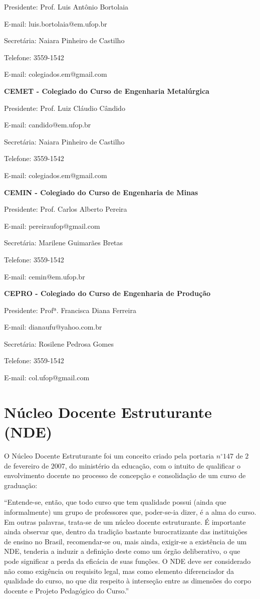 Presidente: Prof. Luis Antônio Bortolaia

E-mail: luis.bortolaia@em.ufop.br

Secretária: Naiara Pinheiro de Castilho

Telefone: 3559-1542

E-mail: colegiados.em@gmail.com

\textbf{CEMET - Colegiado do Curso de Engenharia Metalúrgica}

Presidente: Prof. Luiz Cláudio Cândido

E-mail: candido@em.ufop.br

Secretária: Naiara Pinheiro de Castilho

Telefone: 3559-1542

E-mail: colegiados.em@gmail.com

\textbf{CEMIN - Colegiado do Curso de Engenharia de Minas}

Presidente: Prof. Carlos Alberto Pereira

E-mail: pereiraufop@gmail.com

Secretária: Marilene Guimarães Bretas

Telefone: 3559-1542

E-mail: cemin@em.ufop.br

\textbf{CEPRO - Colegiado do Curso de Engenharia de Produção}

Presidente: Profª. Francisca Diana Ferreira

E-mail: dianaufu@yahoo.com.br

Secretária: Rosilene Pedrosa Gomes

Telefone: 3559-1542

E-mail: col.ufop@gmail.com

\section{Núcleo Docente Estruturante (NDE)}

O Núcleo Docente Estruturante foi um conceito criado pela portaria $n^{\circ} 147$ de $2$ de fevereiro de $2007$, do ministério da educação, com o intuito de qualificar o envolvimento docente no processo de concepção e consolidação de um curso de graduação:
\begin{citacao}
	``Entende-se, então, que todo curso que tem qualidade possui (ainda que informalmente) um grupo de professores que, poder-se-ia  dizer,  é a alma do curso. Em  outras palavras, trata-se de um núcleo docente estruturante.	É importante ainda observar que, dentro da tradição bastante  burocratizante  das instituições de ensino no Brasil, recomendar-se ou, mais ainda, exigir-se a existência de um NDE, tenderia a induzir a definição deste como um 
	órgão deliberativo, o que pode significar a perda da eficácia de suas funções. O NDE  deve ser considerado não como  exigência ou requisito legal, mas como elemento diferenciador da qualidade do curso, no que diz respeito à interseção entre as dimensões do corpo docente e Projeto Pedagógico do Curso.''
\end{citacao}

